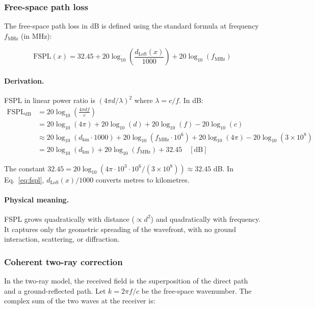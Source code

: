 \documentclass[11pt,a4paper]{article}
\begin{document}
\subsubsection{Free-space path loss}

The free-space path loss in dB is defined using the standard formula at
frequency $f_{\mathrm{MHz}}$ (in MHz):

\begin{equation}
\mathrm{FSPL}(x)
=
32.45
+ 20 \log_{10}\!\left(\frac{d_{\mathrm{LoS}}(x)}{1000}\right)
+ 20 \log_{10}(f_{\mathrm{MHz}})
\label{eq:fspl}
\end{equation}

\paragraph{Derivation.}
FSPL in linear power ratio is $(4\pi d / \lambda)^2$ where $\lambda = c/f$.
In dB:
\begin{align}
\mathrm{FSPL}_{\mathrm{dB}}
&= 20\log_{10}\!\left(\frac{4\pi d f}{c}\right) \nonumber\\
&= 20\log_{10}(4\pi) + 20\log_{10}(d) + 20\log_{10}(f) - 20\log_{10}(c) \nonumber\\
&\approx 20\log_{10}(d_{\mathrm{km}} \cdot 1000)
  + 20\log_{10}(f_{\mathrm{MHz}} \cdot 10^6) + 20\log_{10}(4\pi) - 20\log_{10}(3\times 10^8) \nonumber\\
&= 20\log_{10}(d_{\mathrm{km}}) + 20\log_{10}(f_{\mathrm{MHz}}) + 32.45 \quad [\mathrm{dB}]
\end{align}

The constant $32.45 = 20\log_{10}(4\pi \cdot 10^3 \cdot 10^6 / (3\times
10^8)) \approx 32.45$ dB. In Eq.~\eqref{eq:fspl}, $d_{\mathrm{LoS}}(x)/1000$
converts metres to kilometres.

\paragraph{Physical meaning.} FSPL grows quadratically with distance ($\propto
d^2$) and quadratically with frequency. It captures only the geometric
spreading of the wavefront, with no ground interaction, scattering, or
diffraction.

\subsubsection{Coherent two-ray correction}

In the two-ray model, the received field is the superposition of the direct
path and a ground-reflected path. Let $k = 2\pi f / c$ be the free-space
wavenumber. The complex sum of the two waves at the receiver is:
\end{document}
